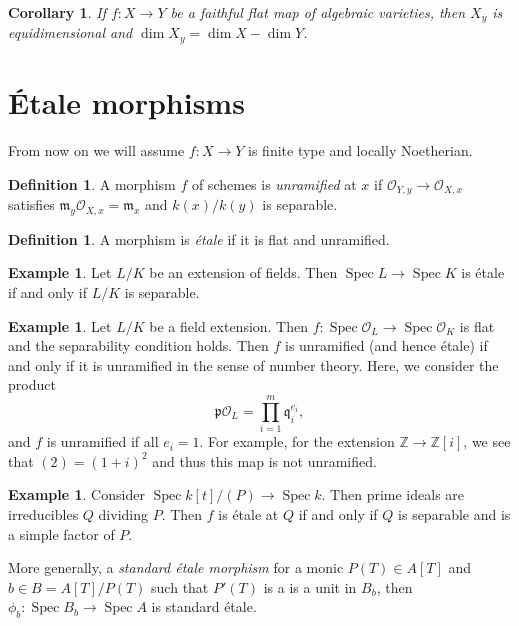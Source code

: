 \documentclass[leqno, openany]{memoir}
\newtheorem{cor}[thm]{Corollary}
\theoremstyle{definition}
\newtheorem{defn}[thm]{Definition}
\newtheorem{exm}[thm]{Example}
\theoremstyle{remark}
\theoremstyle{plain}
\theoremstyle{definition}
\theoremstyle{remark}
\newcommand{\Z}{\mathbb{Z}}
\newcommand{\mc}[1]{\mathcal{#1}}
\newcommand{\mf}[1]{\mathfrak{#1}}
\DeclareMathOperator{\Spec}{Spec}
\begin{document}
\begin{cor}
    If $f \colon X \to Y$ be a faithful flat map of algebraic varieties, then $X_y$ is equidimensional and $\dim X_y = \dim X - \dim Y$.
\end{cor}

\section{\'Etale morphisms}%
\label{sec:'etale_morphisms}

From now on we will assume $f \colon X \to Y$ is finite type and locally Noetherian. 

\begin{defn}
    A morphism $f$ of schemes is \textit{unramified} at $x$ if $\mc{O}_{Y,y} \to \mc{O}_{X,x}$ satisfies $\mf{m}_y \mc{O}_{X,x} = \mf{m}_x$ and $k(x) / k(y)$ is separable.
\end{defn}

\begin{defn}
    A morphism is \textit{\'etale} if it is flat and unramified.
\end{defn}

\begin{exm}
    Let $L/K$ be an extension of fields. Then $\Spec L \to \Spec K$ is \'etale if and only if $L/K$ is separable.
\end{exm}

\begin{exm}
    Let $L/K$ be a field extension. Then $f \colon \Spec \mc{O}_L \to \Spec \mc{O}_K$ is flat and the separability condition holds. Then $f$ is unramified (and hence \'etale) if and only if it is unramified in the sense of number theory. Here, we consider the product
    \[ \mf{p} \mc{O}_L = \prod_{i=1}^m \mf{q}_i^{e_i}, \]
    and $f$ is unramified if all $e_i = 1$. For example, for the extension $\Z \to \Z[i]$, we see that $(2) = (1+i)^2$ and thus this map is not unramified.
\end{exm}

\begin{exm}
    Consider $\Spec k[t]/(P) \to \Spec k$. Then prime ideals are irreducibles $Q$ dividing $P$. Then $f$ is \'etale at $Q$ if and only if $Q$ is separable and is a simple factor of $P$.

    More generally, a \textit{standard \'etale morphism} for a monic $P(T) \in A[T]$ and $b \in B = A[T]/P(T)$ such that $P'(T)$ is a is a unit in $B_b$, then $\phi_b \colon \Spec B_b \to \Spec A$ is standard \'etale.
\end{exm}
\end{document}
